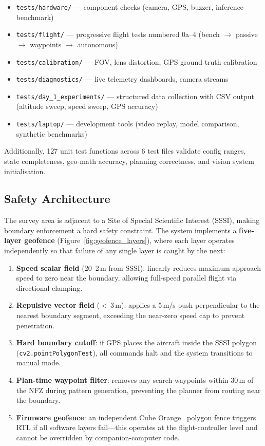 \documentclass[10pt,a4paper]{article}
\begin{document}
\begin{itemize}[nosep]
  \item \texttt{tests/hardware/} --- component checks (camera, GPS, buzzer, inference benchmark)
  \item \texttt{tests/flight/} --- progressive flight tests numbered 0a--4 (bench $\to$ passive $\to$ waypoints $\to$ autonomous)
  \item \texttt{tests/calibration/} --- FOV, lens distortion, GPS ground truth calibration
  \item \texttt{tests/diagnostics/} --- live telemetry dashboards, camera streams
  \item \texttt{tests/day\_1\_experiments/} --- structured data collection with CSV output (altitude sweep, speed sweep, GPS accuracy)
  \item \texttt{tests/laptop/} --- development tools (video replay, model comparison, synthetic benchmarks)
\end{itemize}

Additionally, 127 unit test functions across 6 test files validate config ranges, state completeness, geo-math accuracy, planning correctness, and vision system initialisation.

\subsection{Safety Architecture}\label{sec:safety-arch}

The survey area is adjacent to a Site of Special Scientific Interest (SSSI), making boundary enforcement a hard safety constraint. The system implements a \textbf{five-layer geofence} (Figure~\ref{fig:geofence_layers}), where each layer operates independently so that failure of any single layer is caught by the next:

\begin{enumerate}[nosep]
  \item \textbf{Speed scalar field} (20--2\,m from SSSI): linearly reduces maximum approach speed to zero near the boundary, allowing full-speed parallel flight via directional clamping.
  \item \textbf{Repulsive vector field} ($<$\,3\,m): applies a 5\,m/s push perpendicular to the nearest boundary segment, exceeding the near-zero speed cap to prevent penetration.
  \item \textbf{Hard boundary cutoff}: if GPS places the aircraft inside the SSSI polygon (\texttt{cv2.pointPolygonTest}), all commands halt and the system transitions to manual mode.
  \item \textbf{Plan-time waypoint filter}: removes any search waypoints within 30\,m of the NFZ during pattern generation, preventing the planner from routing near the boundary.
  \item \textbf{Firmware geofence}: an independent Cube Orange~\citep{cubepilot} polygon fence triggers RTL if all software layers fail---this operates at the flight-controller level and cannot be overridden by companion-computer code.
\end{enumerate}
\end{document}
